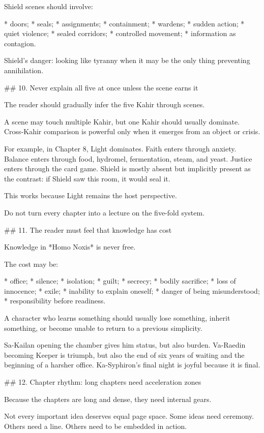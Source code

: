 Shield scenes should involve:

* doors;
* seals;
* assignments;
* containment;
* wardens;
* sudden action;
* quiet violence;
* sealed corridors;
* controlled movement;
* information as contagion.

Shield’s danger: looking like tyranny when it may be the only thing preventing annihilation.

## 10. Never explain all five at once unless the scene earns it

The reader should gradually infer the five Kahir through scenes.

A scene may touch multiple Kahir, but one Kahir should usually dominate. Cross-Kahir comparison is powerful only when it emerges from an object or crisis.

For example, in Chapter 8, Light dominates. Faith enters through anxiety. Balance enters through food, hydromel, fermentation, steam, and yeast. Justice enters through the card game. Shield is mostly absent but implicitly present as the contrast: if Shield saw this room, it would seal it.

This works because Light remains the host perspective.

Do not turn every chapter into a lecture on the five-fold system.

## 11. The reader must feel that knowledge has cost

Knowledge in *Homo Noxis* is never free.

The cost may be:

* office;
* silence;
* isolation;
* guilt;
* secrecy;
* bodily sacrifice;
* loss of innocence;
* exile;
* inability to explain oneself;
* danger of being misunderstood;
* responsibility before readiness.

A character who learns something should usually lose something, inherit something, or become unable to return to a previous simplicity.

Sa-Kailan opening the chamber gives him status, but also burden. Va-Raedin becoming Keeper is triumph, but also the end of six years of waiting and the beginning of a harsher office. Ka-Syphiron’s final night is joyful because it is final.

## 12. Chapter rhythm: long chapters need acceleration zones

Because the chapters are long and dense, they need internal gears.

Not every important idea deserves equal page space. Some ideas need ceremony. Others need a line. Others need to be embedded in action.

